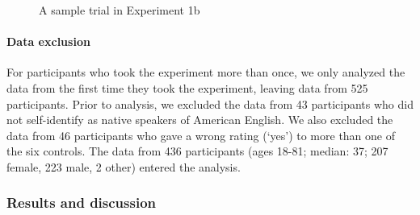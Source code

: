 \documentclass[11pt,fleqn]{article}
\newcommand{\6}{\mbox{$[\hspace*{-.6mm}[$}}
\newcommand{\9}{\mbox{$]\hspace*{-.6mm}]$}}
\begin{document}
\begin{figure}[h!]
\begin{center}
\end{center}
\caption{A sample trial in Experiment 1b}\label{fig-trial-exp1b}
\end{figure}

\paragraph{Data exclusion} For participants who took the experiment more than once, we only analyzed the data from the first time they took the experiment, leaving data from 525 participants. Prior to analysis, we excluded the data from 43 participants who did not self-identify as native speakers of American English. We also excluded the data from 46 participants who gave a wrong rating (`yes') to more than one of the six controls. The data from 436 participants (ages 18-81; median: 37; 207 female, 223 male, 2 other) entered the analysis. 

\subsubsection{Results and discussion}
\end{document}
